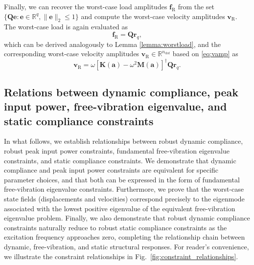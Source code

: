 \documentclass[preprint,3p]{elsarticle}
\newcommand{\ndof}{n_\mathrm{dof}}
\newcommand{\R}{\mathrm{R}}
\numberwithin{equation}{section}
\begin{document}
Finally, we can recover the worst-case load amplitudes $\mathbf{f}_\R$ from the set $\{\mathbf{Q}\mathbf{e}: \mathbf{e} \in \mathbb{R}^{q}, \lVert\mathbf{e}\rVert_2 \le 1\}$ and compute the worst-case velocity amplitudes $\mathbf{v}_\R$. The worst-case load is again evaluated as
%
\begin{equation}
  \mathbf{f}_\R = \mathbf{Q} \mathbf{r}_q,
\end{equation}
%
which can be derived analogously to Lemma \ref{lemma:worstload}, and the corresponding worst-case velocity amplitudes $\mathbf{v}_\R \in \mathbb{R}^{\ndof}$ based on \eqref{eq:vamp} as
%
\begin{equation}
  \mathbf{v}_\R = \omega \left[ \mathbf{K}(\mathbf{a}) - \omega^2 \mathbf{M}(\mathbf{a})\right]^\dagger \mathbf{Q} \mathbf{r}_q.
\end{equation}

\subsection{Relations between dynamic compliance, peak input power, free-vibration eigenvalue, and static compliance constraints}\label{sec:relation}

In what follows, we establish relationships between robust dynamic compliance, robust peak input power constraints, fundamental free-vibration eigenvalue constraints, and static compliance constraints. We demonstrate that dynamic compliance and peak input power constraints are equivalent for specific parameter choices, and that both can be expressed in the form of fundamental free-vibration eigenvalue constraints. Furthermore, we prove that the worst-case state fields (displacements and velocities) correspond precisely to the eigenmode associated with the lowest positive eigenvalue of the equivalent free-vibration eigenvalue problem. Finally, we also demonstrate that robust dynamic compliance constraints naturally reduce to robust static compliance constraints as the excitation frequency approaches zero, completing the relationship chain between dynamic, free-vibration, and static structural responses. For reader's convenience, we illustrate the constraint relationships in Fig.~\ref{fig:constraint_relationships}.
\end{document}
